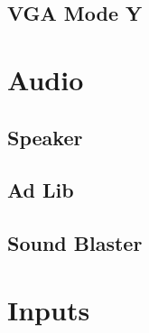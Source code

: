 \documentclass[book.tex]{subfiles}
\begin{document}
  \subsection{VGA Mode Y}
\section{Audio}
  \subsection{Speaker}
  \subsection{Ad Lib}
  \subsection{Sound Blaster}

\section{Inputs}
\end{document}
